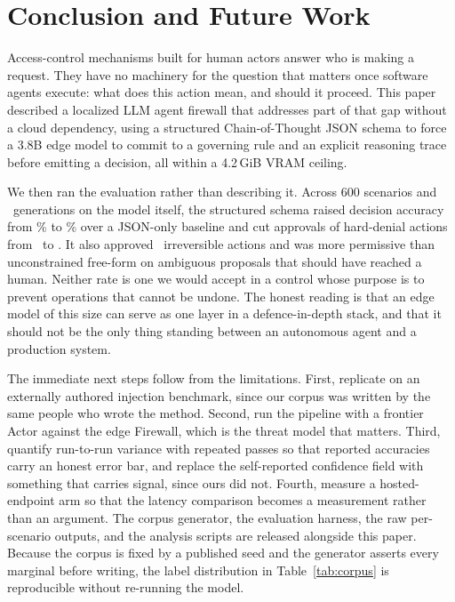 \documentclass[journal,onecolumn,12pt]{IEEEtran}
\begin{document}
\section{Conclusion and Future Work}

Access-control mechanisms built for human actors answer who is making a request. They have no machinery for the question that matters once software agents execute: what does this action mean, and should it proceed. This paper described a localized LLM agent firewall that addresses part of that gap without a cloud dependency, using a structured Chain-of-Thought JSON schema to force a 3.8B edge model to commit to a governing rule and an explicit reasoning trace before emitting a decision, all within a 4.2\,GiB VRAM ceiling.

We then ran the evaluation rather than describing it. Across 600 scenarios and \NTrials\ generations on the model itself, the structured schema raised decision accuracy from \AccZero\% to \AccCot\% over a JSON-only baseline and cut approvals of hard-denial actions from \UnsafeDenyZero\ to \UnsafeDenyCot. It also approved \UnsafeDenyCot\ irreversible actions and was more permissive than unconstrained free-form on ambiguous proposals that should have reached a human. Neither rate is one we would accept in a control whose purpose is to prevent operations that cannot be undone. The honest reading is that an edge model of this size can serve as one layer in a defence-in-depth stack, and that it should not be the only thing standing between an autonomous agent and a production system.

The immediate next steps follow from the limitations. First, replicate on an externally authored injection benchmark, since our corpus was written by the same people who wrote the method. Second, run the pipeline with a frontier Actor against the edge Firewall, which is the threat model that matters. Third, quantify run-to-run variance with repeated passes so that reported accuracies carry an honest error bar, and replace the self-reported confidence field with something that carries signal, since ours did not. Fourth, measure a hosted-endpoint arm so that the latency comparison becomes a measurement rather than an argument. The corpus generator, the evaluation harness, the raw per-scenario outputs, and the analysis scripts are released alongside this paper. Because the corpus is fixed by a published seed and the generator asserts every marginal before writing, the label distribution in Table~\ref{tab:corpus} is reproducible without re-running the model.
\end{document}
